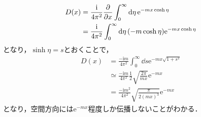 \documentclass[english, dvipdfmx, a4paper]{jsarticle}
\theoremstyle{break}
\newcommand{\e}{\mathrm{e}}
\renewcommand{\i}{\mathrm{i}}
\begin{document}
	\begin{align}
			D(x) &= \frac{\i}{4\pi^2}\pdv{}{x}\int_{0}^{\infty} \dd{\eta}\e^{-mx\cosh\eta}\\
				 &= \frac{\i}{4\pi^2}\int_{0}^{\infty}\dd{\eta}(-m\cosh\eta)\e^{-mx\cosh\eta}
	\end{align}
	となり，$\sinh\eta=s $とおくことで，
	\begin{align}
			D(x) &= \frac{-\i m}{4\pi^2}\int_{0}^{\infty}\dd{s}\e^{-mx\sqrt{1+s^2}}\\
				 &\simeq \frac{-\i m}{4\pi^2}\frac{1}{2}\sqrt{\frac{2\pi}{mx}}\e^{-mx}\\
				 &= \frac{-\i m^2}{4\pi^2}\sqrt{\frac{\pi}{2(mx)^3}}\e^{-mx}
	\end{align}
	となり，空間方向には$\e^{-mx} $程度しか伝播しないことがわかる．
\end{document}
